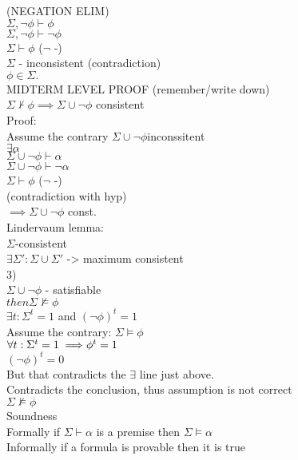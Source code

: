 \documentclass[12pt,oneside,notitlepage]{book}
\theoremstyle{definition}
\begin{document}
(NEGATION ELIM) \\
$\Sigma, \neg \phi \vdash \phi$ \\
$\Sigma, \neg \phi \vdash \neg \phi$ \\
$\Sigma \vdash \phi$ ($\neg$ -) \\

$\Sigma$ - inconsistent (contradiction) \\
$\phi \in \Sigma.$ \\

MIDTERM LEVEL PROOF (remember/write down) \\
$\Sigma \not \vdash \phi \implies \Sigma \cup { \neg \phi }$ consistent  \\
Proof: \\
Assume the contrary $\Sigma \cup { \neg \phi } $inconssitent \\
$\exists \alpha$ \\
$\Sigma \cup { \neg \phi} \vdash \alpha$ \\
$\Sigma \cup { \neg \phi } \vdash \neg \alpha$ \\
$\Sigma \vdash \phi$ ($\neg$ -) \\
(contradiction with hyp) \\
$\implies \Sigma \cup { \neg \phi}$ const.  \\

Lindervaum lemma: \\
$\Sigma$-consistent \\
$\exists \Sigma' : \Sigma \cup \Sigma'$ -> maximum consistent \\

3) \\
$\Sigma \cup { \neg \phi }$ - satisfiable \\
$then \Sigma \not \vDash \phi$ \\

$\exists t: \Sigma^t = 1$ and $(\neg \phi)^t = 1$ \\
Assume the contrary: $\Sigma \vDash \phi$ \\
$\forall t: \Sigma ^t =1 \implies \\
 \phi ^t = 1$ \\
$(\neg \phi)^t = 0$ \\
But that contradicts the $\exists$ line just above. \\
Contradicts the conclusion, thus assumption is not correct \\
$\Sigma \not \vDash \phi$ \\

 
Soundness \\
Formally if $\Sigma \vdash \alpha$ is a premise then $\Sigma \vDash \alpha$ \\
Informally if a formula is provable then it is true \\
\end{document}
